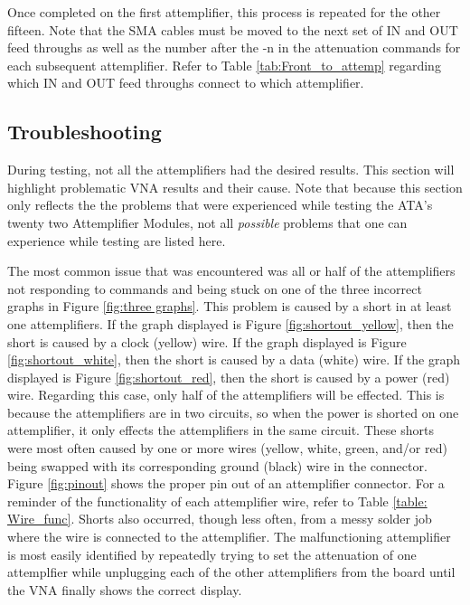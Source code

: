 \documentclass[12pt,a4paper,oneside]{article}
\begin{document}
Once completed on the first attemplifier, this process is repeated for the other fifteen. Note that the SMA cables must be moved to the next set of IN and OUT feed throughs as well as the number after the -n in the attenuation commands for each subsequent attemplifier. Refer to Table \ref{tab:Front_to_attemp} regarding which IN and OUT feed throughs connect to which attemplifier. 

\subsection{Troubleshooting}
\label{sec:8.3}

During testing, not all the attemplifiers had the desired results. This section will highlight problematic VNA results and their cause. Note that because this section only reflects the the problems that were experienced while testing the ATA's twenty two Attemplifier Modules, not all \emph{possible} problems that one can experience while testing are listed here.

The most common issue that was encountered was all or half of the attemplifiers not responding to commands and being stuck on one of the three incorrect graphs in Figure \ref{fig:three graphs}. This problem is caused by a short in at least one attemplifiers. If the graph displayed is Figure \ref{fig:shortout_yellow}, then the short is caused by a clock (yellow) wire. If the graph displayed is Figure \ref{fig:shortout_white}, then the short is caused by a data (white) wire. If the graph displayed is Figure \ref{fig:shortout_red}, then the short is caused by a power (red) wire. Regarding this case, only half of the attemplifiers will be effected. This is because the attemplifiers are in two circuits, so when the power is shorted on one attemplifier, it only effects the attemplifiers in the same circuit.  These shorts were most often caused by one or more wires (yellow, white, green, and/or red) being swapped with its corresponding ground (black) wire in the connector. Figure \ref{fig:pinout} shows the proper pin out of an attemplifier connector. For a reminder of the functionality of each attemplifier wire, refer to Table \ref{table: Wire_func}. Shorts also occurred, though less often, from a messy solder job where the wire is connected to the attemplifier. The malfunctioning attemplifier is most easily identified by repeatedly trying to set the attenuation of one attemplfier while unplugging each of the other attemplifiers from the board until the VNA finally shows the correct display. 
\end{document}
